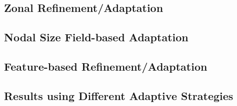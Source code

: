 \subsection{Zonal Refinement/Adaptation}


\subsection{Nodal Size Field-based Adaptation}


\subsection{Feature-based Refinement/Adaptation}

\label{sec:feature_based_strat}


\subsection{Results using Different Adaptive Strategies}

\label{sec:results_adapt}
